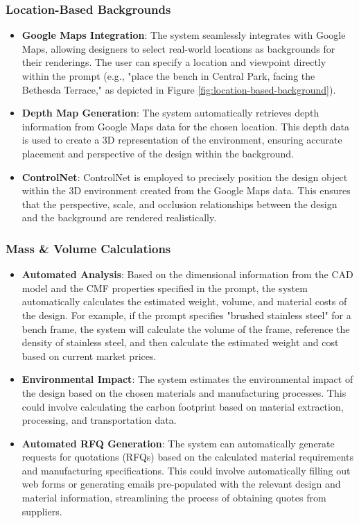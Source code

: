 \documentclass{article}
\begin{document}
\subsubsection{Location-Based Backgrounds}
\begin{itemize}
\item \textbf{Google Maps Integration}: The system seamlessly integrates with Google Maps, allowing designers to select real-world locations as backgrounds for their renderings. The user can specify a location and viewpoint directly within the prompt (e.g., "place the bench in Central Park, facing the Bethesda Terrace," as depicted in Figure \ref{fig:location-based-background}).
\item \textbf{Depth Map Generation}: The system automatically retrieves depth information from Google Maps data for the chosen location. This depth data is used to create a 3D representation of the environment, ensuring accurate placement and perspective of the design within the background.
\item \textbf{ControlNet}: ControlNet is employed to precisely position the design object within the 3D environment created from the Google Maps data. This ensures that the perspective, scale, and occlusion relationships between the design and the background are rendered realistically.
\end{itemize}


\subsubsection{Mass \& Volume Calculations}
\begin{itemize}
\item \textbf{Automated Analysis}: Based on the dimensional information from the CAD model and the CMF properties specified in the prompt, the system automatically calculates the estimated weight, volume, and material costs of the design. For example, if the prompt specifies "brushed stainless steel" for a bench frame, the system will calculate the volume of the frame, reference the density of stainless steel, and then calculate the estimated weight and cost based on current market prices.
\item \textbf{Environmental Impact}: The system estimates the environmental impact of the design based on the chosen materials and manufacturing processes. This could involve calculating the carbon footprint based on material extraction, processing, and transportation data. 
\item \textbf{Automated RFQ Generation}: The system can automatically generate requests for quotations (RFQs) based on the calculated material requirements and manufacturing specifications. This could involve automatically filling out web forms or generating emails pre-populated with the relevant design and material information, streamlining the process of obtaining quotes from suppliers.
\end{itemize}
\end{document}
